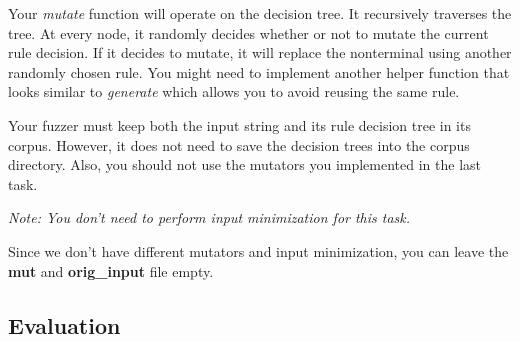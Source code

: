 \documentclass[letterpaper,11pt]{article}
\begin{document}
Your \textit{mutate} function will operate on the decision tree.
It recursively traverses the tree.
At every node, it randomly decides whether or not to mutate the current rule decision.
If it decides to mutate, it will replace the nonterminal using another randomly chosen rule.
You might need to implement another helper function that looks similar to \textit{generate} which allows you to avoid reusing the same rule.


Your fuzzer must keep both the input string and its rule decision tree in its corpus.
However, it does not need to save the decision trees into the corpus directory.
Also, you should not use the mutators you implemented in the last task.


\textit{Note: You don't need to perform input minimization for this task.}

Since we don't have different mutators and input minimization, you can leave the \textbf{mut} and \textbf{orig_input} file empty.










\subsection{Evaluation}
\end{document}
